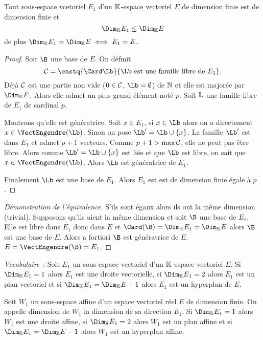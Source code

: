 \begin{theo}
  Tout sous-espace vcetoriel $E_1$ d'un $\mathbb{K}$-espace vectoriel $E$ de dimension finie est de dimension finie et
  \begin{equation}
    \Dim_\K E_1 \leq \Dim_\K E
  \end{equation}
de plus $\Dim_\K E_1 = \Dim_\K E \iff E_1 =E$.
\end{theo}
\begin{proof}
  Soit $\B$ une base de $E$. On définit 
\begin{equation}
  \courbe=\enstq{\Card \Lb}{\Lb \text{~est une famille libre de } E_1}. 
\end{equation}
Déjà $\mathcal{C}$ est une partie non vide ($0 \in \mathcal{C}$, $\Lb=\emptyset$) de $\mathbb{N}$ et elle est majorée par $\Dim_\K E$. Alors elle admet un plus grand élément noté $p$. Soit $\mathbb{L}$ une famille libre de $E_1$ de cardinal $p$. 

Montrons qu'elle est génératrice. Soit $x \in E_1$, si $x \in \Lb$ alors on a directement $x \in \VectEngendre(\Lb)$. Sinon on pose $\Lb' = \Lb \cup \{x\}$. La famille $\Lb'$ est dans $E_1$ et admet $p+1$ vecteurs. Comme $p+1 > \max \mathcal{C}$, elle ne peut pas être libre. Alors comme $\Lb' =\Lb\cup\{x\}$ est liée et que $\Lb$ est libre, on sait que $x \in \VectEngendre(\Lb)$. Alors $\Lb$ est génératrice de $E_1$.

Finalement $\Lb$ est une base de $E_1$. Alors $E_1$ est est de dimension finie égale à $p$.
\end{proof}
\begin{proof}[Démonstration de l'équivalence]
  S'ils sont égaux alors ils ont la même dimension (trivial). Supposons qu'ils aient la même dimension et soit $\B$ une base de $E_1$. Elle est libre dans $E_1$ donc dans $E$ et $\Card(\B)=\Dim_\K E_1=\Dim_\K E$ alors $\B$ est une base de $E$. Alors a fortiori $\B$ est génératrice de $E$. $E=\VectEngendre(\B)=E_1$.
\end{proof}

\emph{Vocabulaire}~: Soit $E_1$ un sous-espace vectoriel d'un $\mathbb{K}$-espace vectoriel $E$. Si $\Dim_\K E_1=1$ alors $E_1$ est une droite vectorielle, si $\Dim_\K E_1=2$ alors $E_1$ est un plan vectoriel et si $\Dim_\K E_1 = \Dim_\K E -1$ alors $E_1$ est un hyperplan de $E$.

\begin{defdef}
  Soit $W_1$ un sous-espace affine d'un espace vectoriel réel $E$ de dimension finie. On appelle dimension de $W_1$ la dimension de sa direction $E_1$. Si $\Dim_\R E_1=1$ alors $W_1$ est une droite affine, si $\Dim_\R E_1=2$ alors $W_1$ est un plan affine et si $\Dim_\R E_1=\Dim_\R E -1 $ alors $W_1$ est un hyperplan affine.
\end{defdef}

